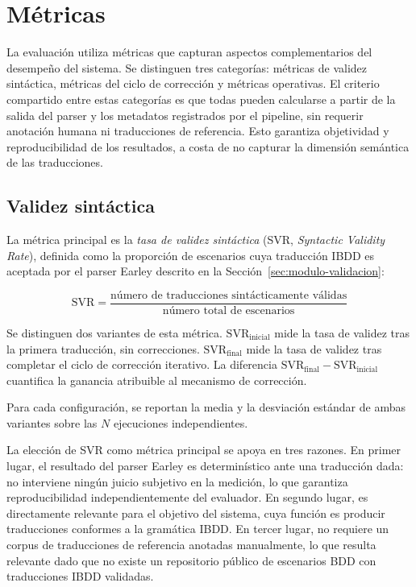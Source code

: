 \section{Métricas}

La evaluación utiliza métricas que capturan aspectos complementarios del desempeño del sistema. Se distinguen tres categorías: métricas de validez sintáctica, métricas del ciclo de corrección y métricas operativas. El criterio compartido entre estas categorías es que todas pueden calcularse a partir de la salida del parser y los metadatos registrados por el pipeline, sin requerir anotación humana ni traducciones de referencia. Esto garantiza objetividad y reproducibilidad de los resultados, a costa de no capturar la dimensión semántica de las traducciones.

\subsection{Validez sintáctica}

La métrica principal es la \textit{tasa de validez sintáctica} (SVR, \textit{Syntactic Validity Rate}), definida como la proporción de escenarios cuya traducción IBDD es aceptada por el parser Earley descrito en la Sección~\ref{sec:modulo-validacion}:

\begin{equation}
\text{SVR} = \frac{\text{número de traducciones sintácticamente válidas}}{\text{número total de escenarios}}
\label{eq:svr}
\end{equation}

Se distinguen dos variantes de esta métrica. $\text{SVR}_\text{inicial}$ mide la tasa de validez tras la primera traducción, sin correcciones. $\text{SVR}_\text{final}$ mide la tasa de validez tras completar el ciclo de corrección iterativo. La diferencia \mbox{$\text{SVR}_\text{final} - \text{SVR}_\text{inicial}$} cuantifica la ganancia atribuible al mecanismo de corrección.

Para cada configuración, se reportan la media y la desviación estándar de ambas variantes sobre las $N$ ejecuciones independientes.

La elección de SVR como métrica principal se apoya en tres razones. En primer lugar, el resultado del parser Earley es determinístico ante una traducción dada: no interviene ningún juicio subjetivo en la medición, lo que garantiza reproducibilidad independientemente del evaluador. En segundo lugar, es directamente relevante para el objetivo del sistema, cuya función es producir traducciones conformes a la gramática IBDD. En tercer lugar, no requiere un corpus de traducciones de referencia anotadas manualmente, lo que resulta relevante dado que no existe un repositorio público de escenarios BDD con traducciones IBDD validadas.


